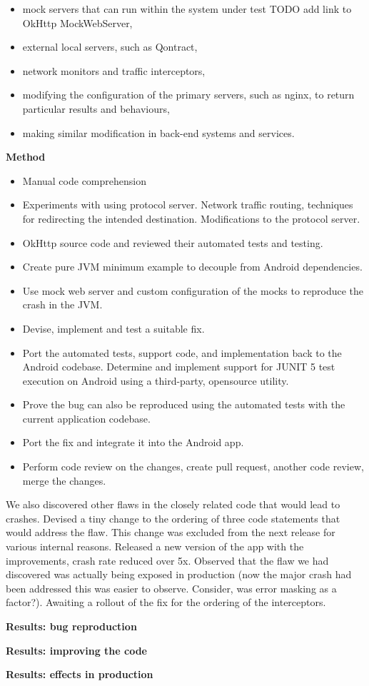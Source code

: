 \begin{itemize}
    \item mock servers that can run within the system under test TODO add link to OkHttp MockWebServer,
    \item external local servers, such as Qontract, 
    \item network monitors and traffic interceptors,
    \item modifying the configuration of the primary servers, such as nginx, to return particular results and behaviours,
    \item making similar modification in back-end systems and services.
\end{itemize}

\textbf{Method} 
\begin{itemize}
    \item Manual code comprehension
    \item Experiments with using protocol server. Network traffic routing, techniques for redirecting the intended destination.  Modifications to the protocol server.
    \item OkHttp source code and reviewed their automated tests and testing.
    \item Create pure JVM minimum example to decouple from Android dependencies.
    \item Use mock web server and custom configuration of the mocks to reproduce the crash in the JVM.
    \item Devise, implement and test a suitable fix.
    \item Port the automated tests, support code, and implementation back to the Android codebase. Determine and implement support for JUNIT 5 test execution on Android using a third-party, opensource utility.
    \item Prove the bug can also be reproduced using the automated tests with the current application codebase.
    \item Port the fix and integrate it into the Android app.
    \item Perform code review on the changes, create pull request, another code review, merge the changes.
\end{itemize}

We also discovered other flaws in the closely related code that would lead to crashes. Devised a tiny change to the ordering of three code statements that would address the flaw. This change was excluded from the next release for various internal reasons. Released a new version of the app with the improvements, crash rate reduced over 5x. Observed that the flaw we had discovered was actually being exposed in production (now the major crash had been addressed this was easier to observe. Consider, was error masking as a factor?). Awaiting a rollout of the fix for the ordering of the interceptors. 


\textbf{Results: bug reproduction}

\textbf{Results: improving the code}

\textbf{Results: effects in production}

